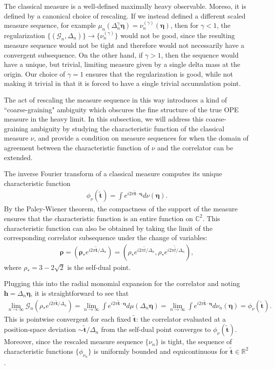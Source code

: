 \documentclass[a4paper,11pt]{article}
\theoremstyle{plain}
\theoremstyle{definition}
\theoremstyle{remark}
\newcommand{\bs}[1]{\boldsymbol{#1}}
\newcommand{\ba}{\begin{equation} \begin{aligned}}
\newcommand{\ea}{\end{aligned} \end{equation}}
\newcommand{\De}{\Delta}
\begin{document}
The classical measure is a well-defined maximally heavy observable. Moreso, it is defined by a canonical choice of rescaling. If we instead defined a different scaled measure sequence, for example $\mu_n(\De_n^\gamma\bs{\eta}) = \nu_n^{(\gamma)}(\bs{\eta})$, then for $\gamma<1$, the regularization $\{(\mathcal{G}_n,\De_n)\} \to \{\nu_n^{(\gamma)}\}$ would not be good, since the resulting measure sequence would not be tight and therefore would not necessarily have a convergent subsequence. On the other hand, if $\gamma > 1$, then the sequence would have a unique, but trivial, limiting measure given by a single delta mass at the origin. Our choice of $\gamma = 1$ ensures that the regularization is good, while not making it trivial in that it is forced to have a single trivial accumulation point. 

The act of rescaling the measure sequence in this way introduces a kind of ``coarse-graining" ambiguity which obscures the fine structure of the true OPE measure in the heavy limit. In this subsection, we will address this coarse-graining ambiguity by studying the characteristic function of the classical measure $\nu$, and provide a condition on measure sequences for when the domain of agreement between the characteristic function of $\nu$ and the correlator can be extended.

The inverse Fourier transform of a classical measure computes its unique characteristic function
\ba
\phi_\nu(\tilde{\bs{t}}) = \int  e^{i 2 \pi \tilde{\bs{t}}\cdot \bs{\eta}}d\nu(\bs{\eta}).
\ea
By the Paley-Wiener theorem, the compactness of the support of the measure ensures that the characteristic function is an entire function on $\mathbb{C}^2$. This characteristic function can also be obtained by taking the limit of the corresponding correlator subsequence under the change of variables:
\ba
\bs{\rho} = (\bs{\rho}_* e^{i2\pi \tilde{\bs{t}}/\De_n})=( \rho_* e^{i 2 \pi \tilde{t}/\Delta_n}, \rho_* e^{i 2 \pi \tilde{\bar{t}}/\Delta_n}),
\ea
where $\rho_* = 3-2\sqrt{2}$ is the self-dual point. 

Plugging this into the radial monomial expansion for the correlator and noting $\bs{h} = \De_n \bs{\eta}$, it is straightforward to see that
\ba
\label{pointwiseconvergence1}
\lim_{n \to \infty} \mathcal{G}_n( \rho_* e^{i 2\pi \tilde{\bs{t}} /\Delta_n}) = \lim_{n \to \infty} \int  e^{i 2 \pi \tilde{\bs{t}} \cdot \bs{\eta} } d\mu(\Delta_n \bs{\eta})=\lim_{n \to \infty} \int  e^{i 2 \pi \tilde{\bs{t}} \cdot \bs{\eta} } d\nu_n(\bs{\eta}) = \phi_\nu(\tilde{\bs{t}}).
\ea
This is pointwise convergent for each fixed $\tilde{\bs{t}}$: the correlator evaluated at a position-space deviation $\sim \tilde{\bs{t}}/\De_n$ from the self-dual point converges to $\phi_\nu(\tilde{\bs{t}})$. Moreover, since the rescaled measure sequence $\{\nu_n\}$ is tight, the sequence of characteristic functions $\{\phi_{\nu_n}\}$ is uniformly bounded and equicontinuous for $\tilde{\bs{t}}\in\mathbb{R}^2$.
\end{document}
